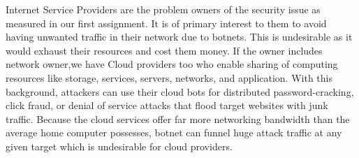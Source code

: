 Internet Service Providers are the problem owners of the security issue as measured in our first assignment. It is of primary interest to them to avoid having unwanted traffic in their network due to botnets. This is undesirable as it would exhaust their resources and cost them money.
If the owner includes network owner,we have Cloud providers too who enable sharing of computing resources like storage, services, servers, networks, and application. With this background, attackers can use their cloud bots for distributed password-cracking, click fraud, or denial of service attacks that flood target websites with junk traffic. Because the cloud services offer far more networking bandwidth than the average home computer possesses, botnet can funnel huge attack traffic at any given target which is undesirable for cloud providers.
